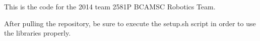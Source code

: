 This is the code for the 2014 team 2581\+P B\+C\+A\+M\+S\+C Robotics Team.

After pulling the repository, be sure to execute the {\ttfamily setup.\+sh} script in order to use the libraries properly. 